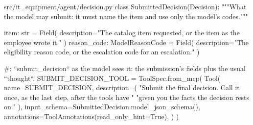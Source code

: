 \documentclass[11pt,letterpaper]{article}
\renewcommand{\_}{\textunderscore\allowbreak}
\begin{document}
\begin{codebox}{src/it_equipment/agent/decision.py}
class SubmittedDecision(Decision):
    """What the model may submit: it must name the item and use only the model's codes."""

    item: str = Field(
        description="The catalog item requested, or the item as the employee wrote it."
    )
    reason_code: ModelReasonCode = Field(
        description="The eligibility reason code, or the escalation code for an escalation."
    )


#: ``submit_decision`` as the model sees it: the submission's fields plus the usual ``thought``.
SUBMIT_DECISION_TOOL = ToolSpec.from_mcp(
    Tool(
        name=SUBMIT_DECISION,
        description=(
            "Submit the final decision. Call it once, as the last step, after the tools have "
            "given you the facts the decision rests on."
        ),
        input_schema=SubmittedDecision.model_json_schema(),
        annotations=ToolAnnotations(read_only_hint=True),
    )
)
\end{codebox}
\end{document}
